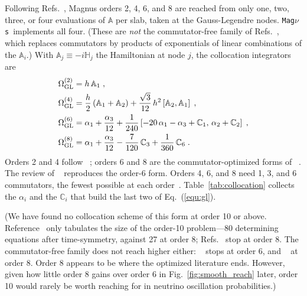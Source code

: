 \documentclass[final,5p,times,twocolumn,sort,compress]{elsarticle}
\makeatletter
\newcommand{\eq}{Eq.}
\newcommand{\fig}{Fig.}
\DeclareRobustCommand{\_}{%
  \ifmmode\nfss@text{\textunderscore}\else\textunderscore\allowbreak\fi}
\providecommand{\Ref}{}
\newcommand{\Refs}{Refs.}
\newcommand{\Tab}{Table}
\newcommand{\equ}[1]{\eq~(\ref{equ:#1})}
\newcommand{\figu}[1]{\fig~\ref{fig:#1}}
\newcommand{\tabl}[1]{\Tab~\ref{tab:#1}}
\newcommand{\magnus}{{\tt Mag}\ensuremath{\nu}{\tt s}}
\makeatother
\begin{document}
Following \Refs\ \cite{Blanes:2000bit, Blanes:2002opt}, Magnus orders 2, 4, 6, and 8 are reached from only one, two, three, or four evaluations of $\mathbb{A}$ per slab, taken at the Gauss-Legendre nodes. \magnus\ implements all four. 
(These are \textit{not} the commutator-free family of \Refs\ \cite{Blanes:2006cf, Alvermann:2011cf}, which replaces commutators by products of exponentials of linear combinations of the $\mathbb{A}_i$.) With $\mathbb{A}_j \equiv -i \mathbb{H}_j$ the Hamiltonian at node $j$, the collocation integrators are
\begin{align}
 \label{equ:gl}
 \Omega_{\rm GL}^{(2)} &= h\, \mathbb{A}_1 \;, \nonumber \\
 \Omega_{\rm GL}^{(4)} &= \frac{h}{2}\left(\mathbb{A}_1 + \mathbb{A}_2\right)
 + \frac{\sqrt{3}}{12}\, h^2 \left[\mathbb{A}_2, \mathbb{A}_1\right] \;, \nonumber \\
 \Omega_{\rm GL}^{(6)} &= \alpha_1 + \frac{\alpha_3}{12}
 + \frac{1}{240} \left[-20\,\alpha_1 - \alpha_3 + \mathbb{C}_1,\,
 \alpha_2 + \mathbb{C}_2\right] \;, \nonumber \\
 \Omega_{\rm GL}^{(8)} &= \alpha_1 + \frac{\alpha_3}{12}
 - \frac{7}{120}\,\mathbb{C}_3 + \frac{1}{360}\,\mathbb{C}_6 \;.
\end{align}
Orders 2 and 4 follow \Ref\ \cite{Blanes:2000bit}; orders 6 and 8 are the commutator-optimized forms of \Ref\ \cite{Blanes:2002opt}. The review of \Ref\ \cite{Blanes:2008xlr} reproduces the order-6 form. Orders 4, 6, and 8 need 1, 3, and 6 commutators, the fewest possible at each order\ \cite{Blanes:2002opt}. \tabl{collocation} collects the $\alpha_i$ and the $\mathbb{C}_i$ that build the last two of \equ{gl}.

(We have found no collocation scheme of this form at order 10 or above. Reference\ \cite{Blanes:2000bit} only tabulates the size of the order-10 problem---80 determining equations after time-symmetry, against 27 at order 8; \Refs\ \cite{Blanes:2002opt, Blanes:2008xlr} stop at order 8. The commutator-free family does not reach higher either: \Ref\ \cite{Blanes:2006cf} stops at order 6, and \Ref\ \cite{Alvermann:2011cf} at order 8. Order 8 appears to be where the optimized literature ends. However, given how little order 8 gains over order 6 in \figu{smooth_reach} later, order 10 would rarely be worth reaching for in neutrino oscillation probabilities.)
\end{document}
